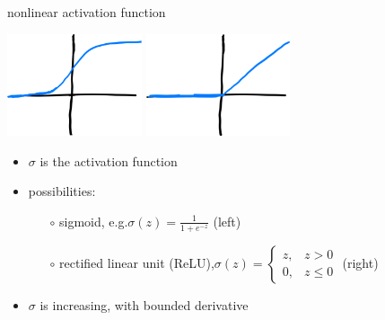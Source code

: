 \documentclass[xcolor={svgnames},
               hyperref={colorlinks,citecolor=DeepPink4,linkcolor=FireBrick,urlcolor=Maroon}]
               {beamer}
\begin{document}
\begin{frame}{nonlinear activation function}

\begin{center}
\includegraphics[height=30mm]{figs/sigmoid} \hspace{10mm} \includegraphics[height=30mm]{figs/relu}
\end{center}

\begin{itemize}
\item $\sigma$ is the \alert{activation function}
\item possibilities:
    \begin{itemize}
    \item[$\circ$] \alert{sigmoid}, e.g.\qquad $\displaystyle \sigma(z) = \frac{1}{1 + e^{-z}}$ \quad (left)
    \item[$\circ$] \alert{rectified linear unit (ReLU)},\qquad $\displaystyle \sigma(z) = \begin{cases} z, & z > 0 \\ 0, & z \le 0 \end{cases}$ \quad (right)
    \end{itemize}
\item $\sigma$ is increasing, with bounded derivative
\end{itemize}
\end{frame}
\end{document}
